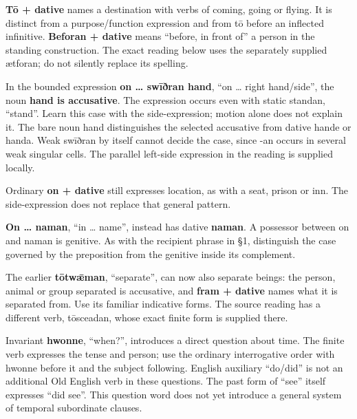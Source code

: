 \textbf{Tō + dative} names a destination with verbs of coming, going or flying. It is distinct from a purpose/\allowbreak{}function expression and from tō before an inflected infinitive. \textbf{Beforan + dative} means “before, in front of” a person in the standing construction. The exact reading below uses the separately supplied ætforan; do not silently replace its spelling.

In the bounded expression \textbf{on … swīðran hand}, “on … right hand/\allowbreak{}side”, the noun \textbf{hand is accusative}. The expression occurs even with static standan, “stand”. Learn this case with the side-expression; motion alone does not explain it. The bare noun hand distinguishes the selected accusative from dative hande or handa. Weak swīðran by itself cannot decide the case, since -an occurs in several weak singular cells. The parallel left-side expression in the reading is supplied locally.

Ordinary \textbf{on + dative} still expresses location, as with a seat, prison or inn. The side-expression does not replace that general pattern.

\textbf{On … naman}, “in … name”, instead has dative \textbf{naman}. A possessor between on and naman is genitive. As with the recipient phrase in §1, distinguish the case governed by the preposition from the genitive inside its complement.

The earlier \textbf{tōtwǣman}, “separate”, can now also separate beings: the person, animal or group separated is accusative, and \textbf{fram + dative} names what it is separated from. Use its familiar indicative forms. The source reading has a different verb, tōsceadan, whose exact finite form is supplied there.

Invariant \textbf{hwonne}, “when?”, introduces a direct question about time. The finite verb expresses the tense and person; use the ordinary interrogative order with hwonne before it and the subject following. English auxiliary “do/\allowbreak{}did” is not an additional Old English verb in these questions. The past form of “see” itself expresses “did see”. This question word does not yet introduce a general system of temporal subordinate clauses.

